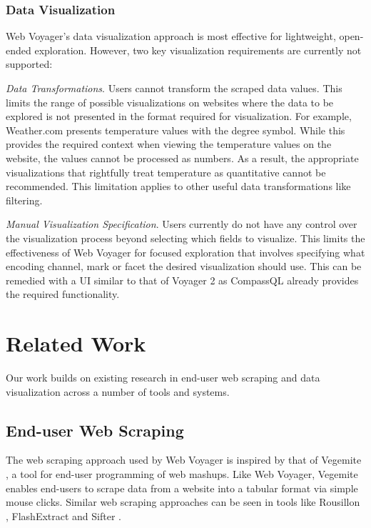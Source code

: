 \documentclass{vgtc}                          %
\begin{document}
\subsubsection{Data Visualization}

Web Voyager's data visualization approach is most effective for
lightweight, open-ended exploration. However, two key visualization 
requirements are currently not supported:

\emph{Data Transformations}. Users cannot transform the scraped data values. This limits the range of possible visualizations on
websites where the data to be explored is not presented in the format required for visualization. For example, Weather.com presents
temperature values with the degree symbol. While this provides the required context when viewing the temperature values on the website, the
values cannot be processed as numbers. As a result, the appropriate visualizations that rightfully treat temperature as quantitative cannot be recommended.
This limitation applies to other useful data transformations like filtering.

\emph{Manual Visualization Specification}. Users currently do not have any control over the visualization process
beyond selecting which fields to visualize. This limits the
effectiveness of Web Voyager for focused exploration that involves
specifying what encoding channel, mark or facet the desired
visualization should use. This can be remedied with a UI similar to that
of Voyager 2 \cite{wongsuphasawat2017} as CompassQL \cite{wongsuphasawat2016} already provides the required functionality.

\section{Related Work} \label{related-work}

Our work builds on existing research in end-user web scraping and data
visualization across a number of tools and systems.

\subsection{End-user Web Scraping}

The web scraping approach used by Web Voyager is inspired by that of
Vegemite \cite{lin2009}, a tool for end-user programming of web
mashups. Like Web Voyager, Vegemite enables end-users to scrape data
from a website into a tabular format via simple mouse clicks. Similar
web scraping approaches can be seen in tools like Rousillon
\cite{chasins2018}, FlashExtract \cite{le2014} and Sifter \cite{huynh2006}.
\end{document}
